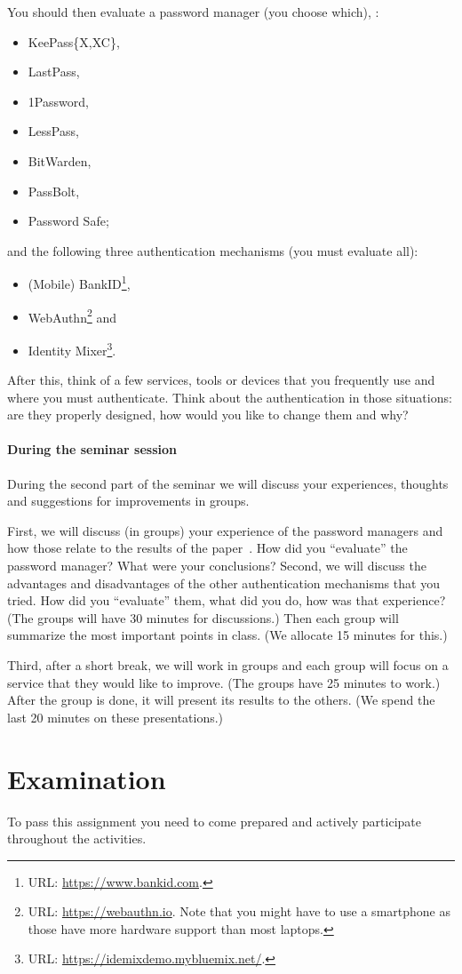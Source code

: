 You should then evaluate a password manager (you choose which), \eg:
\begin{itemize}
  \item KeePass\{X,XC\},
  \item LastPass,
  \item 1Password,
  \item LessPass,
  \item BitWarden,
  \item PassBolt,
  \item Password Safe;
\end{itemize}
and the following three authentication mechanisms (you must evaluate all):
\begin{itemize}
  \item (Mobile) BankID\footnote{%
      URL: \url{https://www.bankid.com}.
    },
  \item WebAuthn\footnote{%
      URL: \url{https://webauthn.io}.
      Note that you might have to use a smartphone as those have more hardware 
      support than most laptops.
    } and
  \item Identity Mixer\footnote{%
      URL: \url{https://idemixdemo.mybluemix.net/}.
    }.
\end{itemize}

After this, think of a few services, tools or devices that you frequently use 
and where you must authenticate.
Think about the authentication in those situations: are they properly designed, 
how would you like to change them and why?

\paragraph{During the seminar session}

During the second part of the seminar we will discuss your experiences, 
thoughts and suggestions for improvements in groups.

First, we will discuss (in groups) your experience of the password managers and 
how those relate to the results of the 
paper~\cite{UsabilityEvaluationOfPasswordManagers}.
How did you \enquote{evaluate} the password manager?
What were your conclusions?
Second, we will discuss the advantages and disadvantages of the other 
authentication mechanisms that you tried.
How did you \enquote{evaluate} them, what did you do, how was that experience?
(The groups will have 30 minutes for discussions.)
Then each group will summarize the most important points in class.
(We allocate 15 minutes for this.)

Third, after a short break, we will work in groups and each group will focus on 
a service that they would like to improve.
(The groups have 25 minutes to work.)
After the group is done, it will present its results to the others.
(We spend the last 20 minutes on these presentations.)


\section{Examination}%
\label{sec:exam}

To pass this assignment you need to come prepared and actively participate 
throughout the activities.


\printbibliography
